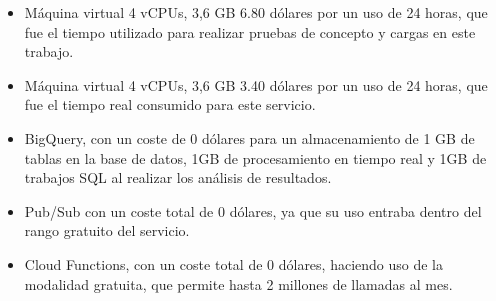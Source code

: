 \begin{itemize}
    \item Máquina virtual 4 vCPUs, 3,6 GB 6.80 dólares por un uso de 24 horas, que fue el tiempo utilizado para realizar pruebas de concepto y cargas en este trabajo.
    \item Máquina virtual 4 vCPUs, 3,6 GB 3.40 dólares por un uso de 24 horas, que fue el tiempo real consumido para este servicio.
    \item BigQuery, con un coste de 0 dólares para un almacenamiento de 1 GB de tablas en la base de datos, 1GB de procesamiento en tiempo real y 1GB de trabajos SQL al realizar los análisis de resultados.
    \item Pub/Sub con un coste total de 0 dólares, ya que su uso entraba dentro del rango gratuito del servicio.
    \item Cloud Functions, con un coste total de 0 dólares, haciendo uso de la modalidad gratuita, que permite hasta 2 millones de llamadas al mes.
\end{itemize}

